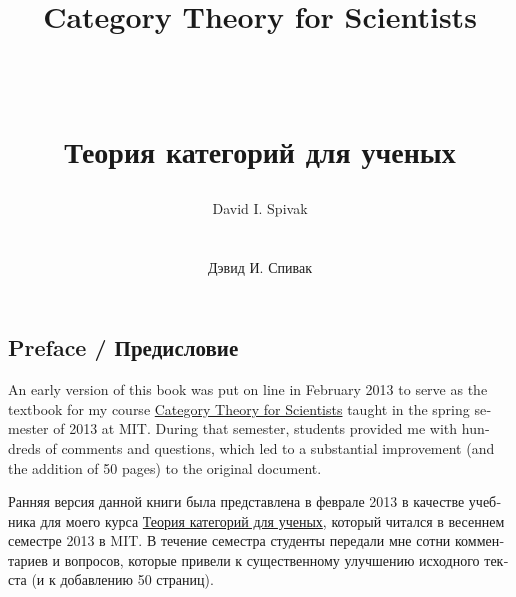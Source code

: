 \documentclass{book}
\theoremstyle{theoremENG}
\theoremstyle{lemmaENG}
\theoremstyle{propositionENG}
\theoremstyle{corollaryENG}
\theoremstyle{factENG}
\theoremstyle{remarkENG}
\theoremstyle{exampleENG}
\theoremstyle{warningENG}
\theoremstyle{questionENG}
\theoremstyle{guessENG}
\theoremstyle{answerENG}
\theoremstyle{constructionENG}
\theoremstyle{rulesENG}
\theoremstyle{excENG}
\theoremstyle{appENG}
\theoremstyle{definitionENG}
\theoremstyle{notationENG}
\theoremstyle{conjectureENG}
\theoremstyle{postulateENG}
\theoremstyle{theoremRUS}
\theoremstyle{lemmaRUS}
\theoremstyle{propositionRUS}
\theoremstyle{corollaryRUS}
\theoremstyle{factRUS}
\theoremstyle{remarkRUS}
\theoremstyle{exampleRUS}
\theoremstyle{warningRUS}
\theoremstyle{questionRUS}
\theoremstyle{guessRUS}
\theoremstyle{answerRUS}
\theoremstyle{constructionRUS}
\theoremstyle{rulesRUS}
\theoremstyle{excRUS}
\theoremstyle{appRUS}
\theoremstyle{definitionRUS}
\theoremstyle{notationRUS}
\theoremstyle{conjectureRUS}
\theoremstyle{postulateRUS}
\begin{document}
\begin{english}

\title{
    ~\\
    \begin{english}Category Theory for Scientists\end{english}\\
    \begin{russian}Теория категорий для ученых\end{russian}
  }
\author{
    \begin{english}David I. Spivak\end{english}\\
    \begin{russian}Дэвид И. Спивак\end{russian}
  }
\maketitle


\chapter*{Preface / Предисловие}

An early version of this book was put on line in February 2013 to serve as the textbook for my course \href{http://math.mit.edu/~dspivak/teaching/sp13/}{\text Category Theory for Scientists} taught in the spring semester of 2013 at MIT. During that semester, students provided me with hundreds of comments and questions, which led to a substantial improvement (and the addition of 50 pages) to the original document.

\begin{russian}Ранняя версия данной книги была представлена в феврале 2013 в качестве учебника для моего курса \href{http://math.mit.edu/~dspivak/teaching/sp13/}{\text Теория категорий для ученых}, который читался в весеннем семестре 2013 в MIT. В течение семестра студенты передали мне сотни комментариев и вопросов, которые привели к существенному улучшению исходного текста (и к добавлению 50 страниц).\end{russian}


\end{english}
\end{document}
